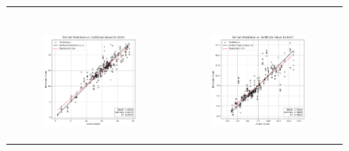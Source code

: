 \begin{figure}
{\begin{tabular}{cc}
\begin{subfigure}{0.5\textwidth}
            \end{subfigure} \\
            \begin{subfigure}{0.5\textwidth}
                \includegraphics[width=\textwidth]{images/one_to_one/elasticnet/Al2O3.png}
            \end{subfigure} & \hspace{3cm}
            \begin{subfigure}{0.5\textwidth}
                \includegraphics[width=\textwidth]{images/one_to_one/elasticnet/FeOT.png}

\end{subfigure}
\end{tabular}}
\end{figure}
